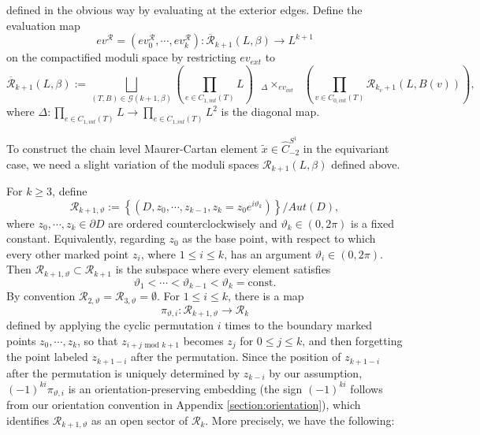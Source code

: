 \documentclass[a4paper]{article}
\numberwithin{equation}{section}
\begin{document}
defined in the obvious way by evaluating at the exterior edges. Define the evaluation map
\begin{equation}
\mathit{ev}^\mathcal{R}=(\mathit{ev}_0^\mathcal{R},\cdots,\mathit{ev}_k^\mathcal{R}):\overline{\mathcal{R}}_{k+1}(L,\beta)\rightarrow L^{k+1}
\end{equation}
on the compactified moduli space by restricting $\mathit{ev}_\mathit{ext}$ to
\begin{equation}
\overline{\mathcal{R}}_{k+1}(L,\beta):=\bigsqcup_{(T,B)\in\mathcal{G}(k+1,\beta)}\left(\prod_{e\in C_{1,\mathit{int}}(T)}L\right)\textrm{ }{{}_\Delta\times_{\mathit{ev}_\mathit{int}}}\textrm{ }\left(\prod_{v\in C_{0,\mathit{int}}(T)}\mathcal{R}_{k_v+1}(L,B(v))\right),
\end{equation}
where $\Delta:\prod_{e\in C_{1,\mathit{int}}(T)}L\rightarrow\prod_{e\in C_{1,\mathit{int}}(T)}L^2$ is the diagonal map.

To construct the chain level Maurer-Cartan element $\tilde{x}\in\widehat{C}_{-2}^{S^1}$ in the equivariant case, we need a slight variation of the moduli spaces $\mathcal{R}_{k+1}(L,\beta)$ defined above. 

For $k\geq3$, define
\begin{equation}
\mathcal{R}_{k+1,\vartheta}:=\left\{(D,z_0,\cdots,z_{k-1},z_k=z_0e^{i\vartheta_k})\right\}/\mathit{Aut}(D),
\end{equation}
where $z_0,\cdots,z_k\in\partial D$ are ordered counterclockwisely and $\vartheta_k\in(0,2\pi)$ is a fixed constant. Equivalently, regarding $z_0$ as the base point, with respect to which every other marked point $z_i$, where $1\leq i\leq k$, has an argument $\vartheta_i\in(0,2\pi)$. Then $\mathcal{R}_{k+1,\vartheta}\subset\mathcal{R}_{k+1}$ is the subspace where every element satisfies
\begin{equation}\label{eq:cons}
\vartheta_1<\cdots<\vartheta_{k-1}<\vartheta_k=\mathrm{const}.
\end{equation}
By convention $\mathcal{R}_{2,\vartheta}=\mathcal{R}_{3,\vartheta}=\emptyset$. For $1\leq i\leq k$, there is a map
\begin{equation}\label{eq:f1}
\pi_{\vartheta,i}:\mathcal{R}_{k+1,\vartheta}\rightarrow\mathcal{R}_k
\end{equation}
defined by applying the cyclic permutation $i$ times to the boundary marked points $z_0,\cdots,z_k$, so that $z_{i+j\textrm{ mod }k+1}$ becomes $z_j$ for $0\leq j\leq k$, and then forgetting the point labeled $z_{k+1-i}$ after the permutation. Since the position of $z_{k+1-i}$ after the permutation is uniquely determined by $z_{k-i}$ by our assumption, $(-1)^{ki}\pi_{\vartheta,i}$ is an orientation-preserving embedding (the sign $(-1)^{ki}$ follows from our orientation convention in Appendix \ref{section:orientation}), which identifies $\mathcal{R}_{k+1,\vartheta}$ as an open sector of $\mathcal{R}_k$. More precisely, we have the following:
\end{document}

